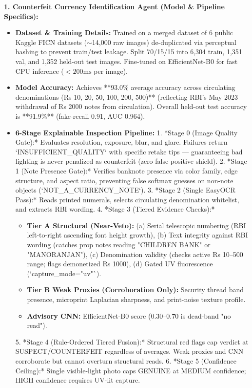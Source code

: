 \documentclass[10pt]{article}
\begin{document}
\textbf{1. Counterfeit Currency Identification Agent (Model \& Pipeline Specifics):}
\begin{itemize}[leftmargin=12pt,topsep=1pt,itemsep=1pt]
\item \textbf{Dataset \& Training Details:} Trained on a merged dataset of 6 public Kaggle FICN datasets ($\sim$14,000 raw images) de-duplicated via perceptual hashing to prevent train/test leakage. Split 70/15/15 into 6,304 train, 1,351 val, and 1,352 held-out test images. Fine-tuned on EfficientNet-B0 for fast CPU inference ($<200\text{ms}$ per image).
\item \textbf{Model Accuracy:} Achieves **93.0\% average accuracy across circulating denominations (Rs 10, 20, 50, 100, 200, 500)** (reflecting RBI's May 2023 withdrawal of Rs 2000 notes from circulation). Overall held-out test accuracy is **91.9\%** (fake-recall 0.91, AUC 0.964).
\item \textbf{6-Stage Explainable Inspection Pipeline:}
  1. *Stage 0 (Image Quality Gate):* Evaluates resolution, exposure, blur, and glare. Failures return `INSUFFICIENT_QUALITY` with specific retake tips --- guaranteeing bad lighting is never penalized as counterfeit (zero false-positive shield).
  2. *Stage 1 (Note Presence Gate):* Verifies banknote presence via color family, edge structure, and aspect ratio, preventing false softmax guesses on non-note objects (`NOT_A_CURRENCY_NOTE`).
  3. *Stage 2 (Single EasyOCR Pass):* Reads printed numerals, selects circulating denomination whitelist, and extracts RBI wording.
  4. *Stage 3 (Tiered Evidence Checks):*
     \begin{itemize}[leftmargin=8pt,topsep=0pt,itemsep=0pt]
     \item \textbf{Tier A Structural (Near-Veto):} (a) Serial telescopic numbering (RBI left-to-right ascending font height growth), (b) Text integrity against RBI wording (catches prop notes reading "CHILDREN BANK" or "MANORANJAN"), (c) Denomination validity (checks active Rs 10--500 range; flags demonetized Rs 1000), (d) Gated UV fluorescence (`capture_mode="uv"`).
     \item \textbf{Tier B Weak Proxies (Corroboration Only):} Security thread band presence, microprint Laplacian sharpness, and print-noise texture profile.
     \item \textbf{Advisory CNN:} EfficientNet-B0 score (0.30--0.70 is dead-band "no read").
     \end{itemize}
  5. *Stage 4 (Rule-Ordered Tiered Fusion):* Structural red flags cap verdict at SUSPECT/COUNTERFEIT regardless of averages. Weak proxies and CNN corroborate but cannot overturn structural reads.
  6. *Stage 5 (Confidence Ceiling):* Single visible-light photo caps GENUINE at MEDIUM confidence; HIGH confidence requires UV-lit capture.
\end{itemize}
\end{document}
